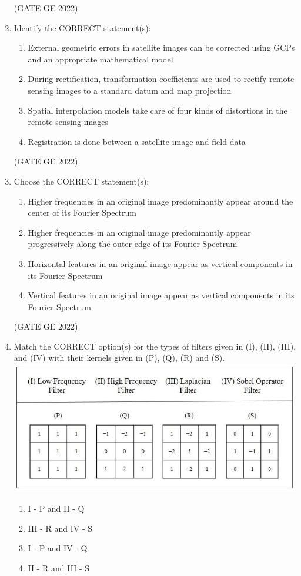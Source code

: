 \documentclass[journal,12pt,onecolumn]{IEEEtran}
\theoremstyle{remark}
\begin{document}
\begin{enumerate}
\hfill (GATE GE 2022)

\item Identify the CORRECT statement(s):
\begin{enumerate}
    \item External geometric errors in satellite images can be corrected using GCPs and an appropriate mathematical model
    \item During rectification, transformation coefficients are used to rectify remote sensing images to a standard datum and map projection
    \item Spatial interpolation models take care of four kinds of distortions in the remote sensing images
    \item Registration is done between a satellite image and field data
\end{enumerate}

\hfill (GATE GE 2022)

\item Choose the CORRECT statement(s):
\begin{enumerate}
    \item Higher frequencies in an original image predominantly appear around the center of its Fourier Spectrum
    \item Higher frequencies in an original image predominantly appear progressively along the outer edge of its Fourier Spectrum
    \item Horizontal features in an original image appear as vertical components in its Fourier Spectrum
    \item Vertical features in an original image appear as vertical components in its Fourier Spectrum
\end{enumerate}

\hfill (GATE GE 2022)

\item Match the CORRECT option(s) for the types of filters given in (I), (II), (III), and (IV) with their kernels given in (P), (Q), (R) and (S).
\centering \includegraphics[width=\columnwidth]{figs/fig_78.png}
\begin{enumerate}
    \item I - P and II - Q
    \item III - R and IV - S
    \item I - P and IV - Q
    \item II - R and III - S
\end{enumerate}


\end{enumerate}
\end{document}
